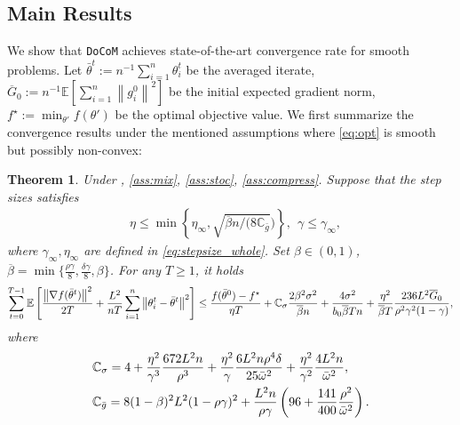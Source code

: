 \documentclass[10pt]{article} %
\theoremstyle{plain}
\newtheorem{theorem}{Theorem}[section]
\theoremstyle{definition}
\theoremstyle{remark}
\newcommand{\aname}{{\tt DoCoM}}
\newcommand{\prm}{\theta}
\newcommand{\bw}{\bar{\omega}}
\newcommand{\avgg}{\bar{g}}
\newcommand{\avgtheta}{\bar{\prm}}
\newcommand{\norm}[1]{\left\| #1 \right\|}
\newcommand{\ConstS}{\mathbb{C}_\sigma}
\newcommand{\ConstG}{\mathbb{C}_{\avgg}}
\newcommand{\InitG}{\overline{G}_0}
\newcommand{\brho}{\overline{\beta}}
\begin{document}
\subsection{Main Results}
We show that {\aname} achieves state-of-the-art convergence rate for smooth problems.
Let $\avgtheta^t := n^{-1} \sum_{i=1}^n \theta_i^t$ be the averaged iterate, $\InitG := n^{-1} \mathbb{E}[ \sum_{i=1}^n \norm{ g_i^0 }^2 ]$ be the initial expected gradient norm, $f^\star := \min_{ \theta' } f( \theta' )$ be the optimal objective value.
We first summarize the convergence results under the mentioned assumptions where \eqref{eq:opt} is smooth but possibly non-convex:
\begin{tcolorbox}
\begin{theorem} \label{th:main}
Under , \ref{ass:mix}, \ref{ass:stoc}, \ref{ass:compress}. Suppose that the step sizes satisfies 
\begin{equation} \label{eq:docom_stepsize}
\begin{split}
& \eta \leq \min \left\{ \eta_\infty, \sqrt{ {\brho n} / ({8 \ConstG}}) \right\},~~\gamma \leq \gamma_\infty,
\end{split}
\end{equation}
where $\gamma_\infty, \eta_\infty$ are defined in \eqref{eq:stepsize_whole}. 
Set $\beta \in (0,1)$, $\brho = \min\{ \frac{\rho \gamma}{8}, \frac{\delta \gamma}{8}, \beta \}$. 
For any $T \geq 1$, it holds
\begin{equation}
    \sum_{t=0}^{T-1} \mathbb{E} \left[ \frac{\norm{ \nabla f( \avgtheta^t)}^2}{2T} + \frac{L^2}{nT} \sum_{i=1}^n \norm{ \theta_i^t - \avgtheta^t}^2 \right] \leq \frac{f( \avgtheta^0 ) - f^\star}{ \eta T } + \ConstS \frac{2 \beta^2 \sigma^2}{\brho n} + \frac{4\sigma^2}{b_0 \brho T n} + \frac{\eta^2}{\brho T} \frac{236 L^2 \InitG}{ \rho^2 \gamma^2 (1-\gamma) }, \notag
\end{equation}\vspace{-.3cm}
where
\begin{align}
    & \ConstS = 4 + \frac{\eta^2}{\gamma^3}\frac{672L^2 n}{\rho^3} + \frac{\eta^2}{\gamma} \frac{6 L^2 n \rho^4 \delta}{25 \bw^2} + \frac{\eta^2}{\gamma^2} \frac{4 L^2 n}{\bw^2}, \label{eq:constS} \\
    & \ConstG = 8(1-\beta)^2 L^2 (1-\rho\gamma)^2 + \frac{L^2 n}{\rho \gamma} \left( 96 + \frac{141}{400} \frac{\rho^2}{\bw^2} \right). \notag 
\end{align}
\end{theorem} 
\end{tcolorbox}
\end{document}
